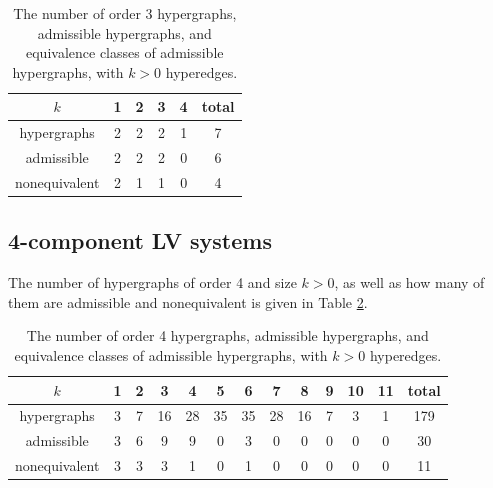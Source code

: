 \documentclass{article}
\begin{document}
\begin{table}[H]
\begin{center}
\begin{tabular}{c|cccc|c}
$k$ & 1 & 2 & 3 & 4 & total \\
\hline
hypergraphs & 2 & 2 & 2 & 1 & 7 \\
admissible & 2 & 2 & 2 & 0 & 6\\
nonequivalent & 2 & 1 & 1 & 0 & 4\\
\end{tabular}
\vspace{3mm}

\parbox{11.5cm}{\caption{\label{t0} The number of order 3 hypergraphs, admissible hypergraphs, and equivalence classes of admissible hypergraphs, with $k>0$ hyperedges.}}
\end{center}
\end{table}

\subsection{4-component LV systems}
The number of hypergraphs of order 4 and size $k>0$, as well as how many of them are admissible and nonequivalent is given in Table \ref{t1}.

\begin{table}[H]
\begin{center}
\begin{tabular}{c|ccccccccccc|c}
$k$ & 1 & 2 & 3 & 4 & 5 & 6 & 7 & 8 & 9 & 10 & 11 & total \\
\hline
hypergraphs  & 3 & 7 & 16 & 28 & 35 & 35 & 28 & 16 & 7 & 3 & 1 & 179 \\
admissible  & 3 & 6 & 9 & 9 & 0 & 3 & 0 & 0 & 0 & 0 & 0 & 30\\
nonequivalent  & 3 & 3 & 3 & 1 & 0 & 1 & 0 & 0 & 0 & 0 & 0 & 11\\
\end{tabular}
\vspace{3mm}

\parbox{11.5cm}{\caption{\label{t1} The number of order 4 hypergraphs, admissible hypergraphs, and equivalence classes of admissible hypergraphs, with $k>0$ hyperedges.}}
\end{center}
\end{table}
\vspace{-12pt}
 
\end{document}
